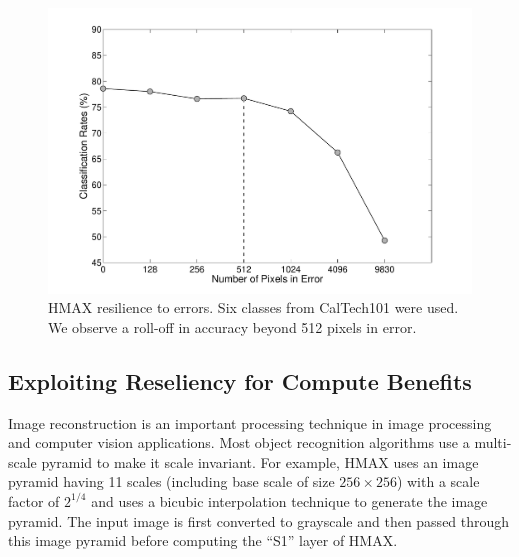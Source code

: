 \begin{figure}[htb!]
\vspace{0pt}
\centering
\includegraphics[width=0.99\linewidth,trim={20 20 30 20}, clip]{./figures/PixelSensitivityAnalysis.pdf}
\vspace{0pt}
\caption{HMAX resilience to errors. Six classes from CalTech101 were used. We observe a roll-off in accuracy beyond 512 pixels in error.}\label{fig:hmax_pixel_sensitivity}
\vspace{0pt}
\end{figure}

\subsection{Exploiting Reseliency for Compute Benefits}
Image reconstruction is an important processing technique in image processing and computer vision applications. Most object recognition algorithms use a multi-scale 
pyramid to make it scale invariant. For example, HMAX uses an image pyramid having 11 scales (including base scale of size $256\times256$) with a 
scale factor of $2^{1/4}$ and uses a bicubic interpolation technique 
to generate the image pyramid. The input image is first converted to grayscale and then passed through this image pyramid before computing the ``S1'' layer of HMAX. 

